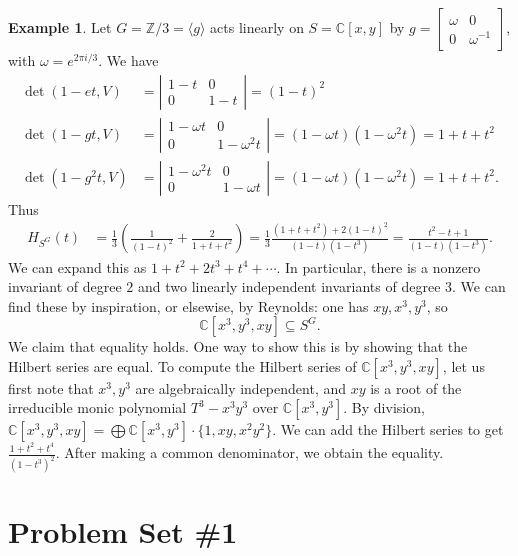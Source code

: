 \documentclass[12pt]{amsart}
\theoremstyle{definition}
\newtheorem{example}[theorem]{Example}
\numberwithin{equation}{theorem}
\def\CC{\mathbb{C}}
\def\ZZ{\mathbb{Z}}
\begin{document}
\begin{example} Let $G=\ZZ/3=\langle g \rangle$ acts linearly on $S=\CC[x,y]$ by $g=\begin{bmatrix} \omega & 0 \\ 0 & \omega^{-1} \end{bmatrix}$, with $\omega=e^{2\pi i /3}$.
We have
\[ \begin{aligned}
\det(1-et,V) &= \left| \begin{matrix} 1-t & 0 \\ 0 & 1-t \end{matrix} \right| = (1-t)^2 \\
\det(1-gt,V) &= \left| \begin{matrix} 1-\omega t & 0 \\ 0 & 1- \omega^2 t \end{matrix} \right| = (1-\omega t)(1-\omega^2 t) = 1+t+t^2 \\
\det(1-g^2t,V) &= \left| \begin{matrix} 1-\omega^2 t & 0 \\ 0 & 1- \omega t \end{matrix} \right| = (1-\omega t)(1-\omega^2 t) = 1+t+t^2.
\end{aligned}\]
Thus
\[  \begin{aligned} H_{S^G}(t) &= \frac{1}{3} \left( \frac{1}{(1-t)^2} + \frac{2}{1+t+t^2} \right) =  \frac{1}{3} \frac{(1+t+t^2) + 2(1-t)^2}{(1-t)(1-t^3)}= \frac{t^2 - t + 1}{(1-t)(1-t^3)}.
\end{aligned}\]
We can expand this as $1 + t^2 + 2t^3 + t^4 + \cdots$. In particular, there is a nonzero invariant of degree $2$ and two linearly independent invariants of degree $3$. We can find these by inspiration, or elsewise, by Reynolds: one has $xy,x^3,y^3$, so
\[ \CC[x^3,y^3,xy] \subseteq S^G.\]
We claim that equality holds. One way to show this is by showing that the Hilbert series are equal. To compute the Hilbert series of $ \CC[x^3,y^3,xy]$, let us first note that $x^3,y^3$ are algebraically independent, and $xy$ is a root of the irreducible monic polynomial $T^3-x^3y^3$ over $\CC[x^3,y^3]$. By division, $ \CC[x^3,y^3,xy] = \bigoplus \CC[x^3,y^3]\cdot\{1,xy,x^2y^2\}$. We can add the Hilbert series to get $\frac{1+t^2+t^4}{(1-t^3)^2}$. After making a common denominator, we obtain the equality.
\end{example}



\newpage


\section*{Problem Set \#1}
\end{document}
